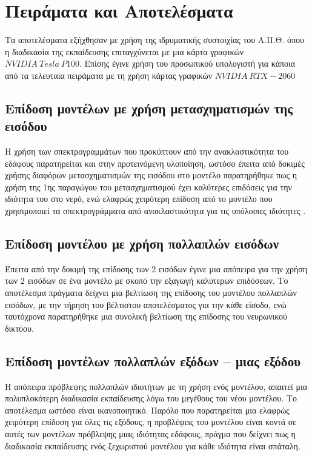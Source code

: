 \chapter{Πειράματα και Αποτελέσματα}
\label{ch:experiments_and_results}

Τα αποτελέσματα εξήχθησαν με χρήση της ιδρυματικής συστοιχίας του Α.Π.Θ. \cite{hpcauth} όπου η διαδικασία της εκπαίδευσης επιταγχύνεται με μια κάρτα γραφικών $NVIDIA~Tesla~P100$. Επίσης έγινε χρήση του προσωπικού υπολογιστή για κάποια από τα τελευταία πειράματα με τη χρήση κάρτας γραφικών $NVIDIA~RTX-2060$

\section{Επίδοση μοντέλων με χρήση μετασχηματισμών της εισόδου }
Η χρήση των σπεκτρογραμμάτων που προκύπτουν από την ανακλαστικότητα  του εδάφους παρατηρείται και στην προτεινόμενη υλοποίηση, ωστόσο έπειτα από δοκιμές χρήσης διαφόρων μετασχηματισμών της εισόδου στο μοντέλο παρατηρήθηκε πως η χρήση της 1ης παραγώγου του μετασχηματισμού  έχει καλύτερες επιδόσεις για την ιδιότητα του  στο νερό, ενώ ελαφρώς χειρότερη επίδοση από το μοντέλο που χρησιμοποιεί τα σπεκτρογράμματα από ανακλαστικότητα για τις υπόλοιπες ιδιότητες .

\section{Επίδοση μοντέλου με χρήση πολλαπλών εισόδων}
Έπειτα από την δοκιμή της επίδοσης των 2 εισόδων έγινε μια απόπειρα για την χρήση των 2 εισόδων σε ένα μοντέλο με σκοπό την εξαγωγή καλύτερων επιδόσεων. Το αποτέλεσμα πράγματα δείχνει μια βελτίωση της επίδοσης του μοντέλου πολλαπλών εισόδων, με την τήρηση του βέλτιστου αποτελέσματος για την κάθε είσοδο, ενώ ταυτόχρονα παρατηρήθηκε μια συνολική βελτίωση της επίδοσης του νευρωνικού δικτύου.

\section{Επίδοση μοντέλων πολλαπλών εξόδων -- μιας εξόδου}
Η απόπειρα πρόβλεψης πολλαπλών ιδιοτήτων με τη χρήση ενός μοντέλου, απαιτεί μια πολυπλοκότερη διαδικασία εκπαίδευσης λόγω του μεγέθους του νέου μοντέλου. Το αποτέλεσμα ωστόσο είναι ικανοποιητικό. Παρόλο που παρατηρείται μια ελαφρώς χειρότερη επίδοση για όλες τις εξόδους, η προβλέψεις του μοντέλου είναι κοντά σε αυτές των μοντέλων πρόβλεψης μιας ιδιότητας εδάφους, πράγμα που δείχνει πως η διαδικασία εκπαίδευσης ενός ξεχωριστού μοντέλου για κάθε ιδιότητα είναι σπάταλη.

